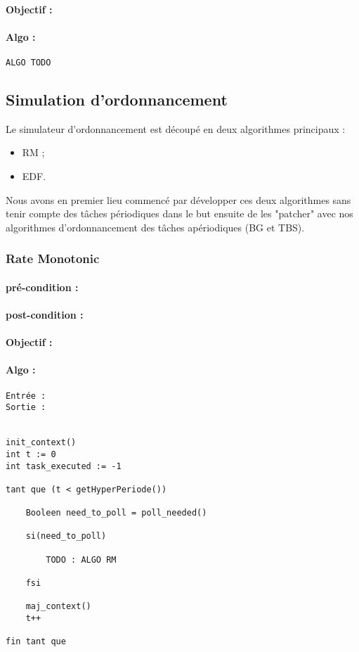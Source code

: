 				\paragraph{Objectif :} 
				\paragraph{Algo :} 
					\begin{verbatim}
ALGO TODO
					\end{verbatim}
	
		\subsection{Simulation d'ordonnancement}
			Le simulateur d'ordonnancement est découpé en deux algorithmes principaux :
			\begin{itemize}
				\item RM ;
				\item EDF.
			\end{itemize}
			
			Nous avons en premier lieu commencé par développer ces deux algorithmes sans tenir compte des tâches périodiques dans le but ensuite de les "patcher" avec nos algorithmes d'ordonnancement des tâches apériodiques (BG et TBS).
			
			\subsubsection{Rate Monotonic}
				\paragraph{pré-condition :} 
				\paragraph{post-condition :} 
				\paragraph{Objectif :} 
				\paragraph{Algo :} 
					\begin{verbatim}
Entrée : 
Sortie :  


init_context()
int t := 0
int task_executed := -1

tant que (t < getHyperPeriode())
	
    Booleen need_to_poll = poll_needed()
	
    si(need_to_poll)
        
        TODO : ALGO RM
        
    fsi
	
    maj_context()
    t++
	
fin tant que
					\end{verbatim}
					
